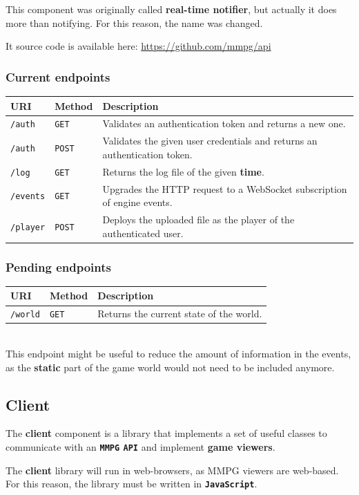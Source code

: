 \documentclass[a4paper,11pt]{article}
\begin{document}
This component was originally called \textbf{real-time notifier}, but actually it does more than notifying. For this reason,
the name was changed.

It source code is available here: \url{https://github.com/mmpg/api}
\subsubsection{Current endpoints}
\begin{tabularx}{\textwidth}{l | l | X}
\textbf{URI} & \textbf{Method} & \textbf{Description}\\
\hline
\texttt{/auth} & \texttt{GET} & Validates an authentication token and returns a new one.\\
\texttt{/auth} & \texttt{POST} & Validates the given user credentials and returns an authentication token.\\
\texttt{/log} & \texttt{GET} & Returns the log file of the given \textbf{time}.\\
\texttt{/events} & \texttt{GET} & Upgrades the HTTP request to a WebSocket subscription of engine events.\\
\texttt{/player} & \texttt{POST} & Deploys the uploaded file as the player of the authenticated user.\\
\end{tabularx}
\subsubsection{Pending endpoints}
\begin{tabularx}{\textwidth}{l | l | X}
\textbf{URI} & \textbf{Method} & \textbf{Description}\\
\hline
\texttt{/world} & \texttt{GET} & Returns the current state of the world.\\
\end{tabularx}
\\[0.2cm]
\indent
This endpoint might be useful to reduce the amount of information in the events, as the \textbf{static} part of
the game world would not need to be included anymore.
\subsection{Client}
The \textbf{client} component is a library that implements a set of useful classes to communicate with
an \textbf{\texttt{MMPG} \texttt{API}} and implement \textbf{game viewers}.

The \textbf{client} library will run in web-browsers, as \texttt{}MMPG\texttt{} viewers are web-based. For this reason, the library
must be written in \textbf{\texttt{JavaScript}}.
\end{document}
